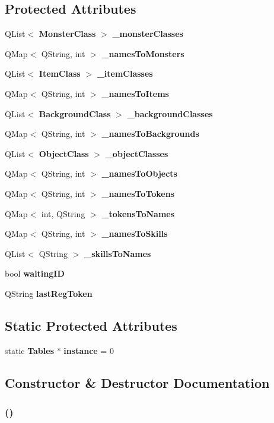\subsection*{Protected Attributes}
\begin{CompactItemize}
\item 
QList$<$ {\bf Monster\-Class} $>$ {\bf \_\-monster\-Classes}
\item 
QMap$<$ QString, int $>$ {\bf \_\-names\-To\-Monsters}
\item 
QList$<$ {\bf Item\-Class} $>$ {\bf \_\-item\-Classes}
\item 
QMap$<$ QString, int $>$ {\bf \_\-names\-To\-Items}
\item 
QList$<$ {\bf Background\-Class} $>$ {\bf \_\-background\-Classes}
\item 
QMap$<$ QString, int $>$ {\bf \_\-names\-To\-Backgrounds}
\item 
QList$<$ {\bf Object\-Class} $>$ {\bf \_\-object\-Classes}
\item 
QMap$<$ QString, int $>$ {\bf \_\-names\-To\-Objects}
\item 
QMap$<$ QString, int $>$ {\bf \_\-names\-To\-Tokens}
\item 
QMap$<$ int, QString $>$ {\bf \_\-tokens\-To\-Names}
\item 
QMap$<$ QString, int $>$ {\bf \_\-names\-To\-Skills}
\item 
QList$<$ QString $>$ {\bf \_\-skills\-To\-Names}
\item 
bool {\bf waiting\-ID}
\item 
QString {\bf last\-Reg\-Token}
\end{CompactItemize}
\subsection*{Static Protected Attributes}
\begin{CompactItemize}
\item 
static {\bf Tables} $\ast$ {\bf instance} = 0
\end{CompactItemize}


\subsection{Constructor \& Destructor Documentation}
\subsubsection{ ()}\label{classTables_a0}


